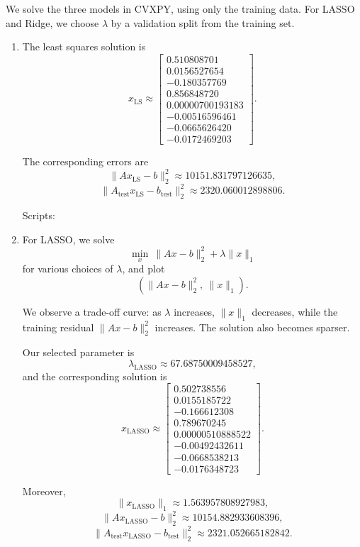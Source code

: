 \documentclass[11pt,letter,notitlepage]{article}
\theoremstyle{definition}
\begin{document}
\begin{solution}

We solve the three models in CVXPY, using only the training data. For LASSO and Ridge, we choose \(\lambda\) by a validation split from the training set.

\begin{enumerate}[label=(\alph*)]

\item
The least squares solution is
\[
x_{\mathrm{LS}} \approx
\begin{bmatrix}
0.510808701\\
0.0156527654\\
-0.180357769\\
0.856848720\\
0.00000700193183\\
-0.00516596461\\
-0.0665626420\\
-0.0172469203
\end{bmatrix}.
\]

The corresponding errors are
\[
\|Ax_{\mathrm{LS}}-b\|_2^2 \approx 10151.831797126635,
\]
\[
\|A_{\mathrm{test}}x_{\mathrm{LS}}-b_{\mathrm{test}}\|_2^2 \approx 2320.060012898806.
\]

Scripts:


\item
For LASSO, we solve
\[
\min_x \ \|Ax-b\|_2^2+\lambda\|x\|_1
\]
for various choices of \(\lambda\), and plot
\[
\left(\|Ax-b\|_2^2,\ \|x\|_1\right).
\]

We observe a trade-off curve: as \(\lambda\) increases, \(\|x\|_1\) decreases, while the training residual \(\|Ax-b\|_2^2\) increases. The solution also becomes sparser.

Our selected parameter is
\[
\lambda_{\mathrm{LASSO}} \approx 67.68750009458527,
\]
and the corresponding solution is
\[
x_{\mathrm{LASSO}} \approx
\begin{bmatrix}
0.502738556\\
0.0155185722\\
-0.166612308\\
0.789670245\\
0.00000510888522\\
-0.00492432611\\
-0.0668538213\\
-0.0176348723
\end{bmatrix}.
\]

Moreover,
\[
\|x_{\mathrm{LASSO}}\|_1 \approx 1.563957808927983,
\]
\[
\|Ax_{\mathrm{LASSO}}-b\|_2^2 \approx 10154.882933608396,
\]
\[
\|A_{\mathrm{test}}x_{\mathrm{LASSO}}-b_{\mathrm{test}}\|_2^2 \approx 2321.052665182842.
\]


\end{enumerate}
\end{solution}
\end{document}
